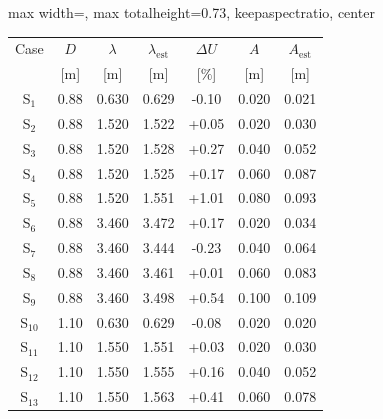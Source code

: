 \setcounter{table}{0}
\renewcommand{\thetable}{B\arabic{table}}
\begingroup
\centering
\captionsetup{
font=footnotesize,
skip=4pt
}
\label{Table:syn_res}
\footnotesize
\setlength{\tabcolsep}{4pt}
\renewcommand{\arraystretch}{0.60}
\begin{adjustbox}{
max width=\textwidth,
max totalheight=0.73\textheight,
keepaspectratio,
center
}
\begin{tabular}{@{}c c c c c c c@{}}
\toprule
Case & $D$ & $\lambda$ & $\lambda_{\mathrm{est}}$ & $\Delta U$ & $A$ & $A_{\mathrm{est}}$ \\
 & {[\(\mathrm{m}\)]} & {[\(\mathrm{m}\)]} & {[\(\mathrm{m}\)]} & {[\(\%\)]} & {[\(\mathrm{m}\)]} & {[\(\mathrm{m}\)]} \\
\midrule
S$_{1}$ & 0.88 & 0.630 & 0.629 & -0.10 & 0.020 & 0.021 \\
S$_{2}$ & 0.88 & 1.520 & 1.522 & +0.05 & 0.020 & 0.030 \\
S$_{3}$ & 0.88 & 1.520 & 1.528 & +0.27 & 0.040 & 0.052 \\
S$_{4}$ & 0.88 & 1.520 & 1.525 & +0.17 & 0.060 & 0.087 \\
S$_{5}$ & 0.88 & 1.520 & 1.551 & +1.01 & 0.080 & 0.093 \\
S$_{6}$ & 0.88 & 3.460 & 3.472 & +0.17 & 0.020 & 0.034 \\
S$_{7}$ & 0.88 & 3.460 & 3.444 & -0.23 & 0.040 & 0.064 \\
S$_{8}$ & 0.88 & 3.460 & 3.461 & +0.01 & 0.060 & 0.083 \\
S$_{9}$ & 0.88 & 3.460 & 3.498 & +0.54 & 0.100 & 0.109 \\
S$_{10}$ & 1.10 & 0.630 & 0.629 & -0.08 & 0.020 & 0.020 \\
S$_{11}$ & 1.10 & 1.550 & 1.551 & +0.03 & 0.020 & 0.030 \\
S$_{12}$ & 1.10 & 1.550 & 1.555 & +0.16 & 0.040 & 0.052 \\
S$_{13}$ & 1.10 & 1.550 & 1.563 & +0.41 & 0.060 & 0.078 \\

\end{tabular}
\end{adjustbox}
